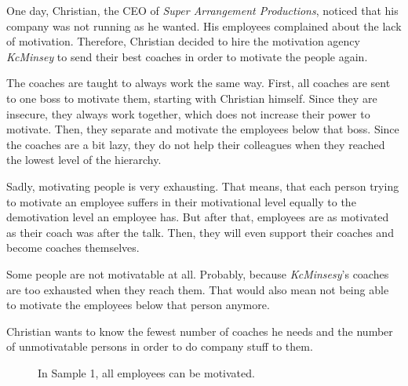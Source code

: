 



\makeheader

One day, Christian, the CEO of \textit{Super Arrangement Productions}, noticed that his company
was not running as he wanted. His employees complained about the lack of motivation.
Therefore, Christian decided to hire the motivation agency \textit{KcMinsey} to send their best
coaches in order to motivate the people again.

The coaches are taught to always work the same way. First, all coaches are sent to one boss to
motivate them, starting with Christian himself. Since they are insecure, they always work together,
which does not increase their power to motivate.
Then, they separate and motivate the employees below that boss. Since the coaches are a bit lazy,
they do not help their colleagues when they reached the lowest level of the hierarchy.

Sadly, motivating people is very exhausting. That means, that each person trying to motivate
an employee suffers in their motivational level equally to the demotivation level an employee
has. But after that, employees are as motivated as their coach was after the talk. Then,
they will even support their coaches and become coaches themselves.

Some people are not motivatable at all. Probably, because \textit{KcMinsesy}'s coaches
are too exhausted when they reach them. That would also mean not being able to motivate the
employees below that person anymore.

Christian wants to know the fewest number of coaches he needs and the number
of unmotivatable persons in order to do company stuff to them.

\begin{figure}[h!]
  \centering

  \caption{In Sample 1, all employees can be motivated.}
\end{figure}

